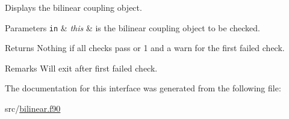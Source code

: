 Displays the bilinear coupling object. 


\begin{DoxyParams}[1]{Parameters}
\mbox{\tt in}  & {\em this} & is the bilinear coupling object to be checked. \\
\hline
\end{DoxyParams}
\begin{DoxyReturn}{Returns}
Nothing if all checks pass or 1 and a warn for the first failed check. 
\end{DoxyReturn}
\begin{DoxyRemark}{Remarks}
Will exit after first failed check. 
\end{DoxyRemark}


The documentation for this interface was generated from the following file\-:\begin{DoxyCompactItemize}
\item 
src/\hyperlink{bilinear_8f90}{bilinear.\-f90}\end{DoxyCompactItemize}
